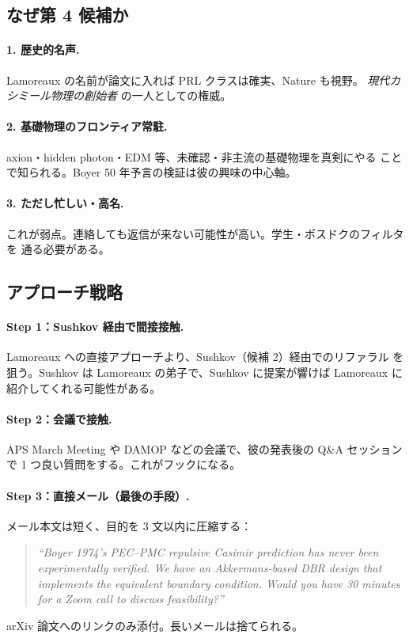 \documentclass[11pt,a4paper]{article}
\def\textbf#1{#1}%
\begin{document}
\subsection{なぜ第 4 候補か}

\paragraph{1. 歴史的名声.}
Lamoreaux の名前が論文に入れば PRL クラスは確実、Nature も視野。
\emph{現代カシミール物理の創始者} の一人としての権威。

\paragraph{2. 基礎物理のフロンティア常駐.}
axion・hidden photon・EDM 等、\textbf{未確認・非主流の基礎物理を真剣にやる}
ことで知られる。Boyer 50 年予言の検証は彼の興味の中心軸。

\paragraph{3. ただし忙しい・高名.}
これが弱点。連絡しても返信が来ない可能性が高い。学生・ポスドクのフィルタを
通る必要がある。

\subsection{アプローチ戦略}

\paragraph{Step 1：Sushkov 経由で間接接触.}
Lamoreaux への直接アプローチより、\textbf{Sushkov（候補 2）経由でのリファラル}
を狙う。Sushkov は Lamoreaux の弟子で、Sushkov に提案が響けば
Lamoreaux に紹介してくれる可能性がある。

\paragraph{Step 2：会議で接触.}
APS March Meeting や DAMOP などの会議で、彼の発表後の Q\&A セッションで
1 つ良い質問をする。これがフックになる。

\paragraph{Step 3：直接メール（最後の手段）.}
メール本文は短く、目的を 3 文以内に圧縮する：
\begin{quote}
\itshape
``Boyer 1974's PEC--PMC repulsive Casimir prediction has never been
experimentally verified. We have an Akkermans-based DBR design that
implements the equivalent boundary condition. Would you have 30 minutes
for a Zoom call to discuss feasibility?''
\end{quote}
arXiv 論文へのリンクのみ添付。長いメールは捨てられる。
\end{document}
